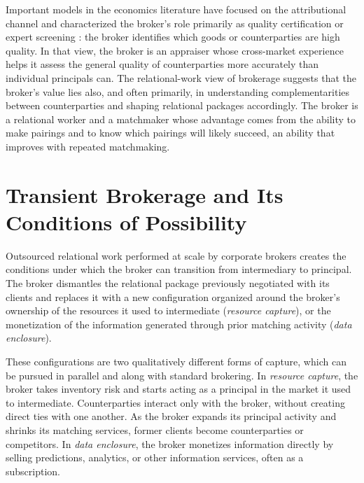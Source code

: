 \documentclass[
]{article}
\begin{document}
Important models in the economics literature have focused on the attributional channel and characterized the broker's role primarily as quality certification \autocite{liMiddlemenPrivateInformation1998} or expert screening \autocite{bethuneInformationbasedTheoryFinancial2022a}: the broker identifies which goods or counterparties are high quality. In that view, the broker is an appraiser whose cross-market experience helps it assess the general quality of counterparties more accurately than individual principals can. The relational-work view of brokerage suggests that the broker's value lies also, and often primarily, in understanding complementarities between counterparties and shaping relational packages accordingly. The broker is a relational worker and a matchmaker whose advantage comes from the ability to make pairings and to know which pairings will likely succeed, an ability that improves with repeated matchmaking.



\section{Transient Brokerage and Its Conditions of Possibility}
\label{sec:transient-brokerage}

Outsourced relational work performed at scale by corporate brokers creates the conditions under which the broker can transition from intermediary to principal. The broker dismantles the relational package previously negotiated with its clients and replaces it with a new configuration organized around the broker's ownership of the resources it used to intermediate (\emph{resource capture}), or the monetization of the information generated through prior matching activity (\emph{data enclosure}).

These configurations are two qualitatively different forms of capture, which can be pursued in parallel and along with standard brokering. In \emph{resource capture}, the broker takes inventory risk and starts acting as a principal in the market it used to intermediate. Counterparties interact only with the broker, without creating direct ties with one another. As the broker expands its principal activity and shrinks its matching services, former clients become counterparties or competitors. In \emph{data enclosure}, the broker monetizes information directly by selling predictions, analytics, or other information services, often as a subscription.
\end{document}
